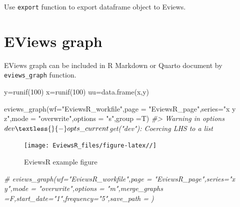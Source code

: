 \documentclass[
]{article}
\newenvironment{Shaded}{\begin{snugshade}}{\end{snugshade}}
\newcommand{\AttributeTok}[1]{\textcolor[rgb]{0.77,0.63,0.00}{#1}}
\newcommand{\CommentTok}[1]{\textcolor[rgb]{0.56,0.35,0.01}{\textit{#1}}}
\newcommand{\DecValTok}[1]{\textcolor[rgb]{0.00,0.00,0.81}{#1}}
\newcommand{\FunctionTok}[1]{\textcolor[rgb]{0.00,0.00,0.00}{#1}}
\newcommand{\NormalTok}[1]{#1}
\newcommand{\OtherTok}[1]{\textcolor[rgb]{0.56,0.35,0.01}{#1}}
\newcommand{\SpecialCharTok}[1]{\textcolor[rgb]{0.00,0.00,0.00}{#1}}
\newcommand{\StringTok}[1]{\textcolor[rgb]{0.31,0.60,0.02}{#1}}
\begin{document}
Use \texttt{export} function to export dataframe object to Eviews.

\begin{Shaded}
\end{Shaded}

\hypertarget{eviews-graph}{%
\section{EViews graph}\label{eviews-graph}}

EViews graph can be included in R Markdown or Quarto document by \texttt{eviews\_graph} function.

\begin{Shaded}
\begin{Highlighting}[]

\NormalTok{y}\OtherTok{=}\FunctionTok{runif}\NormalTok{(}\DecValTok{100}\NormalTok{)}
\NormalTok{x}\OtherTok{=}\FunctionTok{runif}\NormalTok{(}\DecValTok{100}\NormalTok{)}
\NormalTok{uu}\OtherTok{=}\FunctionTok{data.frame}\NormalTok{(x,y)}

 \FunctionTok{eviews\_graph}\NormalTok{(}\AttributeTok{wf=}\StringTok{"EviewsR\_workfile"}\NormalTok{,}\AttributeTok{page =} \StringTok{"EviewsR\_page"}\NormalTok{,}\AttributeTok{series=}\StringTok{"x y z"}\NormalTok{,}\AttributeTok{mode =} \StringTok{"overwrite"}\NormalTok{,}\AttributeTok{options =} \StringTok{"s"}\NormalTok{,}\AttributeTok{group =}\NormalTok{T)}
\CommentTok{\#\textgreater{} Warning in options$dev \textless{}{-} opts\_current$get("dev"): Coercing LHS to a list}
\end{Highlighting}
\end{Shaded}

\begin{figure}
\texttt{[image: EviewsR\_files/figure-latex//]} \caption{EviewsR example figure}\label{fig:eviewsGraph}
\end{figure}

\begin{Shaded}
\begin{Highlighting}[]
 
  \CommentTok{\# eviews\_graph(wf="EviewsR\_workfile",page = "EviewsR\_page",series="x y",mode = "overwrite",options = "m",merge\_graphs =F,start\_date="1",frequency="5",save\_path = \textquotesingle{}\textquotesingle{})}
 
\end{Highlighting}
\end{Shaded}
\end{document}

